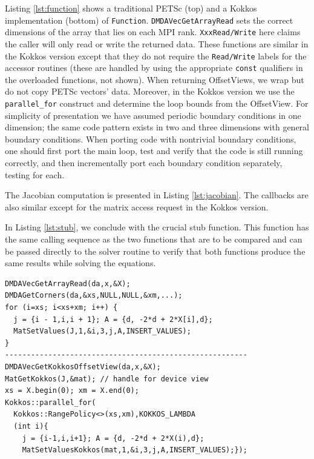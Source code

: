 \documentclass[5p,times]{elsarticle}
\begin{document}
Listing \ref{lst:function} shows a traditional PETSc (top) and a Kokkos implementation (bottom) of {\tt Function}.
{\tt DMDAVecGetArrayRead} sets the correct dimensions of the array that lies on each MPI rank. {\tt XxxRead/Write} here claims the caller will only read or write the returned data.
These functions are similar in the Kokkos version except that they do not 
require the {\tt Read/Write} labels for the accessor routines (these are handled by using the appropriate
{\tt const} qualifiers in the overloaded functions, not shown). 
When returning OffsetViews, we wrap but do not copy PETSc vectors' data.
Moreover, in the Kokkos version
we use the {\tt parallel\_for}
construct and determine the loop bounds from the OffsetView.
For simplicity of presentation we have 
assumed periodic boundary conditions in one dimension; the same code pattern exists 
in two and three dimensions with general boundary conditions.
When porting code with nontrivial boundary conditions, one should first port the main loop, test and verify that the 
code is still running correctly, and then incrementally port each boundary condition separately, testing for each. 

The Jacobian computation is presented in Listing \ref{lst:jacobian}.
The
callbacks are also similar except for the matrix access request in the
Kokkos version. 

In Listing \ref{lst:stub}, we conclude with the crucial stub function.  This function
has the same calling sequence as the two functions
that are to be compared and can be passed directly to the solver routine
to verify that both 
functions produce the same results while solving the equations. 

\begin{lstlisting}[caption={Traditional PETSc Jacobian (top) and Kokkos version (bottom)},label={lst:jacobian},frame=single,captionpos=b]
DMDAVecGetArrayRead(da,x,&X);
DMDAGetCorners(da,&xs,NULL,NULL,&xm,...);
for (i=xs; i<xs+xm; i++) {
  j = {i - 1,i,i + 1}; A = {d, -2*d + 2*X[i],d};
  MatSetValues(J,1,&i,3,j,A,INSERT_VALUES);
}
--------------------------------------------------------
DMDAVecGetKokkosOffsetView(da,x,&X);
MatGetKokkos(J,&mat); // handle for device view
xs = X.begin(0); xm = X.end(0);
Kokkos::parallel_for(
  Kokkos::RangePolicy<>(xs,xm),KOKKOS_LAMBDA 
  (int i){
    j = {i-1,i,i+1}; A = {d, -2*d + 2*X(i),d};
    MatSetValuesKokkos(mat,1,&i,3,j,A,INSERT_VALUES);});
\end{lstlisting}
\end{document}
